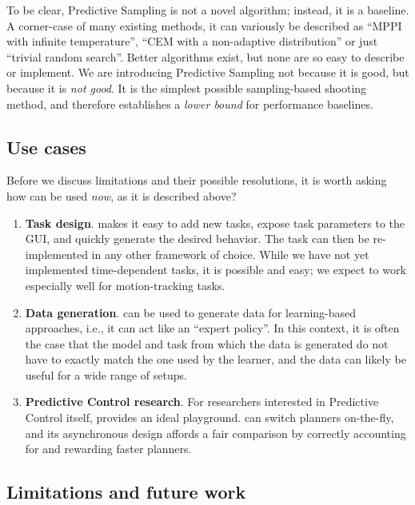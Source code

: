 To be clear, Predictive Sampling is not a novel algorithm; instead, it is a baseline. A corner-case of many existing methods, it can variously be described as ``MPPI with infinite temperature'',  ``CEM with a non-adaptive distribution'' or just ``trivial random search''. Better algorithms exist, but none are so easy to describe or implement. We are introducing Predictive Sampling not because it is good, but because it is \emph{not good}. It is the simplest possible sampling-based shooting method, and therefore establishes a \emph{lower bound} for performance baselines.

\subsection{Use cases} \label{ps_current}

Before we discuss limitations and their possible resolutions, it is worth asking how can \app{} be used \emph{now}, as it is described above?
\begin{enumerate}
	\item \textbf{Task design}. \app{} makes it easy to add new tasks, expose task parameters to the GUI, and quickly generate the desired behavior. The task can then be re-implemented in any other framework of choice. While we have not yet implemented time-dependent tasks, it is possible and easy; we expect \app{} to work especially well for motion-tracking tasks.
	\item \textbf{Data generation}. \app{} can be used to generate data for learning-based approaches, i.e., it can act like an ``expert policy''. In this context, it is often the case that the model and task from which the data is generated do not have to exactly match the one used by the learner, and the data can likely be useful for a wide range of setups.
	\item \textbf{Predictive Control research}. For researchers interested in Predictive Control itself, \app{} provides an ideal playground. \app{} can switch planners on-the-fly, and its asynchronous design affords a fair comparison by correctly accounting for and rewarding faster planners.
\end{enumerate}

\subsection{Limitations and future work} \label{ps_future_work}

